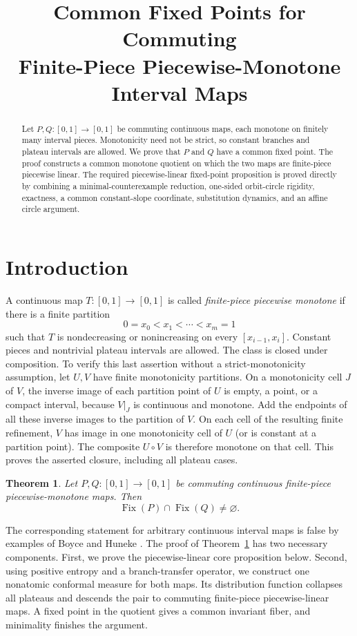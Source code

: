 \documentclass[11pt]{article}
\title{Common Fixed Points for Commuting\\
Finite-Piece Piecewise-Monotone Interval Maps}
\author{}
\date{}
\newtheorem{theorem}{Theorem}
\theoremstyle{definition}
\theoremstyle{remark}
\newcommand{\I}{[0,1]}
\newcommand{\Fix}{\operatorname{Fix}}
\begin{document}
\maketitle

\begin{abstract}
Let $P,Q:[0,1]\to[0,1]$ be commuting continuous maps, each monotone on
finitely many interval pieces.  Monotonicity need not be strict, so constant
branches and plateau intervals are allowed.  We prove that $P$ and $Q$ have
a common fixed point.  The proof constructs a common monotone quotient on
which the two maps are finite-piece piecewise linear.  The required
piecewise-linear fixed-point proposition is proved directly by combining a
minimal-counterexample reduction, one-sided orbit-circle rigidity, exactness,
a common constant-slope coordinate, substitution dynamics, and an affine
circle argument.
\end{abstract}

\tableofcontents

\section{Introduction}

A continuous map $T:\I\to\I$ is called \emph{finite-piece piecewise
monotone} if there is a finite partition
\[
 0=x_0<x_1<\cdots <x_m=1
\]
such that $T$ is nondecreasing or nonincreasing on every
$[x_{i-1},x_i]$.  Constant pieces and nontrivial plateau intervals are
allowed.  The class is closed under composition.  To verify this last
assertion without a strict-monotonicity assumption, let \(U,V\) have finite
monotonicity partitions.  On a monotonicity cell \(J\) of \(V\), the inverse
image of each partition point of \(U\) is empty, a point, or a compact
interval, because \(V|_J\) is continuous and monotone.  Add the endpoints of
all these inverse images to the partition of \(V\).  On each cell of the
resulting finite refinement, \(V\) has image in one monotonicity cell of \(U\)
(or is constant at a partition point).  The composite \(U\circ V\) is
therefore monotone on that cell.  This proves the asserted closure, including
all plateau cases.

\begin{theorem}\label{thm:main}
Let $P,Q:\I\to\I$ be commuting continuous finite-piece
piecewise-monotone maps.  Then
\[
 \Fix(P)\cap\Fix(Q)\ne\varnothing.
\]
\end{theorem}

The corresponding statement for arbitrary continuous interval maps is
false by examples of Boyce and Huneke \cite{Boyce,Huneke}.  The proof of
Theorem~\ref{thm:main} has two necessary components.  First, we prove the
piecewise-linear core proposition below.  Second, using positive entropy and
a branch-transfer operator, we construct one nonatomic conformal measure for
both maps.  Its distribution function collapses all plateaus and descends
the pair to commuting finite-piece piecewise-linear maps.  A fixed point in
the quotient gives a common invariant fiber, and minimality finishes the
argument.
\end{document}

